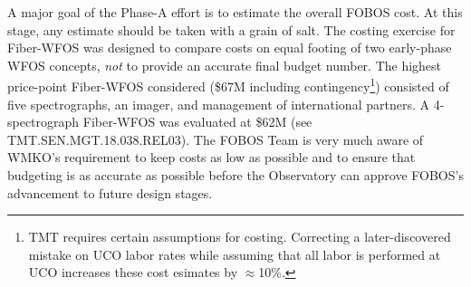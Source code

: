 
A major goal of the Phase-A effort is to estimate the overall FOBOS cost.  At this stage, any estimate should be taken with a grain of salt.  The costing exercise for Fiber-WFOS was designed to compare costs on equal footing of two early-phase WFOS concepts, {\it not} to provide an accurate final budget number.  The highest price-point Fiber-WFOS considered (\$67M including contingency\footnote{TMT requires certain assumptions for costing.  Correcting a later-discovered mistake on UCO labor rates while assuming that all labor is performed at UCO increases these cost esimates by $\approx$10\%.}) consisted of five spectrographs, an imager, and management of international partners. A 4-spectrograph Fiber-WFOS was evaluated at \$62M (see TMT.SEN.MGT.18.038.REL03). The FOBOS Team is very much aware of WMKO's requirement to keep costs as low as possible and to ensure that budgeting is as accurate as possible before the Observatory can approve FOBOS's advancement to future design stages.  





